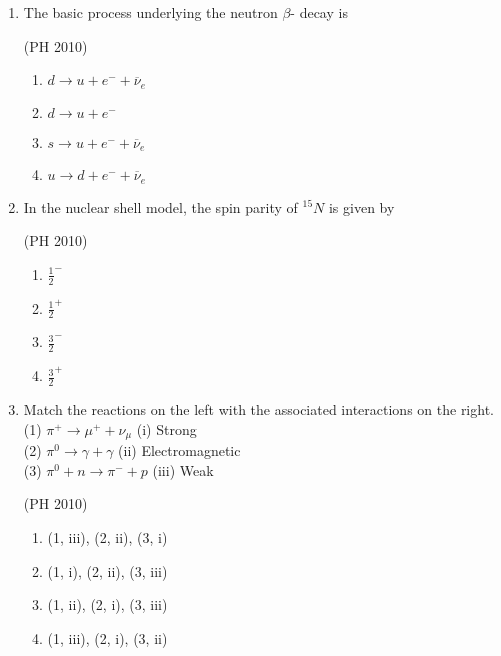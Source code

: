 \documentclass[journal,12pt,onecolumn]{IEEEtran}
\theoremstyle{remark}
\begin{document}
\begin{enumerate}
\item The basic process underlying the neutron $\beta$- decay is 


\hfill{(PH 2010)}
\begin{multicols}{2}
\begin{enumerate}
\item $d \rightarrow u + e^- + \overline{\nu}_e$
\item $d \rightarrow u + e^-$ 
\item $s \rightarrow u + e^- + \overline{\nu}_e$ 
\item $u \rightarrow d + e^- + \overline{\nu}_e$
\end{enumerate}
\end{multicols}

\item In the nuclear shell model, the spin parity of $^{15}N$ is given by 

\hfill{(PH 2010)}
\begin{multicols}{4}
\begin{enumerate}
\item $\frac{1}{2}^{-}$ 
\item $\frac{1}{2}^{+}$ 
\item $\frac{3}{2}^{-}$ 
\item $\frac{3}{2}^{+}$ 
\end{enumerate}
\end{multicols}



\item Match the reactions on the left with the associated interactions on the right. \\
(1) $\pi^+ \rightarrow \mu^+ + \nu_{\mu}$  \quad \qquad \qquad \qquad (i) Strong \\
(2) $\pi^0 \rightarrow \gamma + \gamma$ \qquad \qquad \qquad \qquad (ii) Electromagnetic\\ 
(3) $\pi^0 + n \rightarrow \pi^- + p$ \qquad \qquad \qquad (iii) Weak 


\hfill{(PH 2010)}
\begin{multicols}{2}
\begin{enumerate}
\item (1, iii), (2, ii), (3, i) 
\item (1, i), (2, ii), (3, iii) 
\item (1, ii), (2, i), (3, iii) 
\item (1, iii), (2, i), (3, ii)
\end{enumerate}
\end{multicols}



\end{enumerate}
\end{document}

